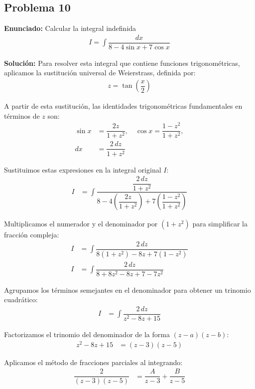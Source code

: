 \subsection*{Problema 10}

\textbf{Enunciado:} Calcular la integral indefinida
\begin{align*}
    I = \int \dfrac{dx}{8 - 4\sin x + 7\cos x}
\end{align*}

\textbf{Solución:} Para resolver esta integral que contiene funciones trigonométricas, aplicamos la sustitución universal de Weierstrass, definida por:
\begin{align*}
    z = \tan\left(\dfrac{x}{2}\right)
\end{align*}

A partir de esta sustitución, las identidades trigonométricas fundamentales en términos de $z$ son:
\begin{align*}
    \sin x &= \dfrac{2z}{1 + z^2}, \quad 
    \cos x = \dfrac{1 - z^2}{1 + z^2}, \\
    dx &= \dfrac{2\,dz}{1 + z^2}
\end{align*}

Sustituimos estas expresiones en la integral original $I$:
\begin{align*}
    I &= \int \dfrac{\dfrac{2\,dz}{1 + z^2}}{8 - 4\left(\dfrac{2z}{1 + z^2}\right) + 7\left(\dfrac{1 - z^2}{1 + z^2}\right)}
\end{align*}

Multiplicamos el numerador y el denominador por $(1 + z^2)$ para simplificar la fracción compleja:
\begin{align*}
    I &= \int \dfrac{2\,dz}{8(1 + z^2) - 8z + 7(1 - z^2)} \\
    I &= \int \dfrac{2\,dz}{8 + 8z^2 - 8z + 7 - 7z^2}
\end{align*}

Agrupamos los términos semejantes en el denominador para obtener un trinomio cuadrático:
\begin{align*}
    I &= \int \dfrac{2\,dz}{z^2 - 8z + 15}
\end{align*}

Factorizamos el trinomio del denominador de la forma $(z - a)(z - b)$:
\begin{align*}
    z^2 - 8z + 15 &= (z - 3)(z - 5)
\end{align*}

Aplicamos el método de fracciones parciales al integrando:
\begin{align*}
    \dfrac{2}{(z - 3)(z - 5)} &= \dfrac{A}{z - 3} + \dfrac{B}{z - 5}
\end{align*}

